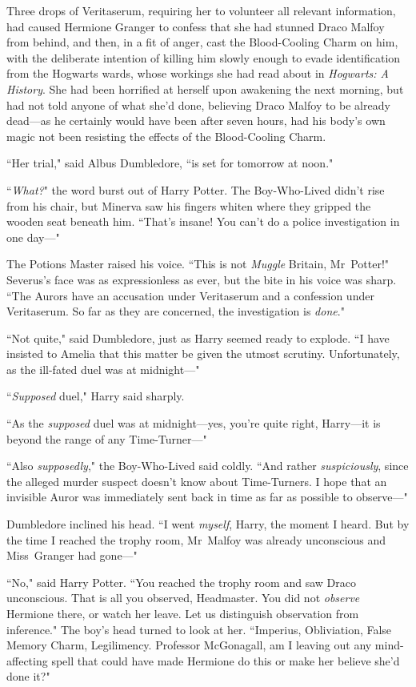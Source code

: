 Three drops of Veritaserum, requiring her to volunteer all relevant information, had caused Hermione Granger to confess that she had stunned Draco Malfoy from behind, and then, in a fit of anger, cast the Blood-Cooling Charm on him, with the deliberate intention of killing him slowly enough to evade identification from the Hogwarts wards, whose workings she had read about in \emph{Hogwarts: A History}. She had been horrified at herself upon awakening the next morning, but had not told anyone of what she'd done, believing Draco Malfoy to be already dead—as he certainly would have been after seven hours, had his body's own magic not been resisting the effects of the Blood-Cooling Charm.

``Her trial," said Albus Dumbledore, ``is set for tomorrow at noon."

``\emph{What?}" the word burst out of Harry Potter. The Boy-Who-Lived didn't rise from his chair, but Minerva saw his fingers whiten where they gripped the wooden seat beneath him. ``That's insane! You can't do a police investigation in one day—"

The Potions Master raised his voice. ``This is not \emph{Muggle} Britain, Mr~Potter!" Severus's face was as expressionless as ever, but the bite in his voice was sharp. ``The Aurors have an accusation under Veritaserum and a confession under Veritaserum. So far as they are concerned, the investigation is \emph{done}."

``Not quite," said Dumbledore, just as Harry seemed ready to explode. ``I have insisted to Amelia that this matter be given the utmost scrutiny. Unfortunately, as the ill-fated duel was at midnight—"

``\emph{Supposed} duel," Harry said sharply.

``As the \emph{supposed} duel was at midnight—yes, you're quite right, Harry—it is beyond the range of any Time-Turner—"

``Also \emph{supposedly}," the Boy-Who-Lived said coldly. ``And rather \emph{suspiciously}, since the alleged murder suspect doesn't know about Time-Turners. I hope that an invisible Auror was immediately sent back in time as far as possible to observe—"

Dumbledore inclined his head. ``I went \emph{myself}, Harry, the moment I heard. But by the time I reached the trophy room, Mr~Malfoy was already unconscious and Miss~Granger had gone—"

``No," said Harry Potter. ``You reached the trophy room and saw Draco unconscious. That is all you observed, Headmaster. You did not \emph{observe} Hermione there, or watch her leave. Let us distinguish observation from inference." The boy's head turned to look at her. ``Imperius, Obliviation, False Memory Charm, Legilimency. Professor McGonagall, am I leaving out any mind-affecting spell that could have made Hermione do this or make her believe she'd done it?"

